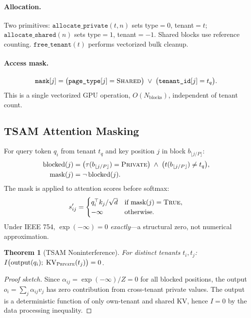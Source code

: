 \documentclass[11pt]{article}
\newtheorem{theorem}{Theorem}
\begin{document}
\paragraph{Allocation.} Two primitives: $\texttt{allocate\_private}(t, n)$ sets type$=0$, tenant$=t$; $\texttt{allocate\_shared}(n)$ sets type$=1$, tenant$=-1$. Shared blocks use reference counting. $\texttt{free\_tenant}(t)$ performs vectorized bulk cleanup.

\paragraph{Access mask.}
\begin{equation}
    \texttt{mask}[j] = \bigl(\texttt{page\_type}[j] = \textsc{Shared}\bigr) \;\lor\; \bigl(\texttt{tenant\_id}[j] = t_q\bigr).
\end{equation}
This is a single vectorized GPU operation, $O(N_{\mathrm{blocks}})$, independent of tenant count.

\subsection{TSAM Attention Masking}
\label{sec:design:attention}

For query token $q_i$ from tenant $t_q$ and key position $j$ in block $b_{\lfloor j/P \rfloor}$:
\begin{align}
    \mathrm{blocked}(j) &= \bigl(\tau(b_{\lfloor j/P \rfloor}) = \textsc{Private}\bigr) \;\land\; \bigl(t(b_{\lfloor j/P \rfloor}) \neq t_q\bigr), \\
    \mathrm{mask}(j) &= \lnot\, \mathrm{blocked}(j).
\end{align}
The mask is applied to attention scores before softmax:
\begin{equation}
    s'_{ij} = \begin{cases}
        q_i^\top k_j / \sqrt{d} & \text{if } \mathrm{mask}(j) = \textsc{True}, \\
        -\infty & \text{otherwise}.
    \end{cases}
\end{equation}
Under IEEE 754, $\exp(-\infty) = 0$ \emph{exactly}---a structural zero, not numerical approximation.

\begin{theorem}[TSAM Noninterference]
\label{thm:noninterference}
For distinct tenants $t_i, t_j$: $I\bigl(\mathrm{output}(q_i);\; \mathrm{KV}_{\textsc{Private}}(t_j)\bigr) = 0$.
\end{theorem}
\begin{proof}[Proof sketch]
Since $\alpha_{ij} = \exp(-\infty)/Z = 0$ for all blocked positions, the output $o_i = \sum_j \alpha_{ij} v_j$ has zero contribution from cross-tenant private values. The output is a deterministic function of only own-tenant and shared KV, hence $I = 0$ by the data processing inequality.
\end{proof}
\end{document}
